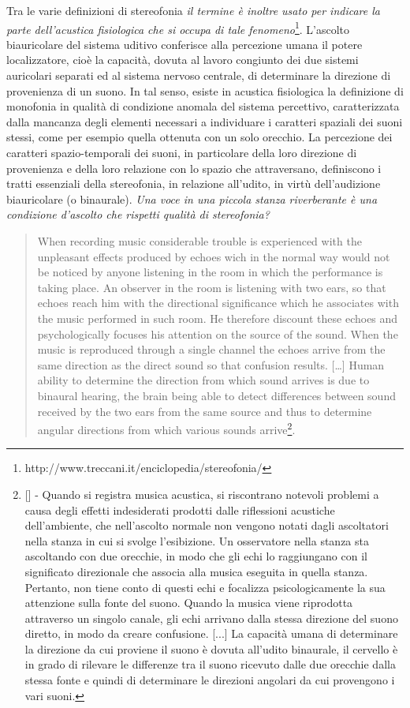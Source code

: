 Tra le varie definizioni di stereofonia \emph{il
termine è inoltre usato per indicare la parte dell’acustica fisiologica
che si occupa di tale fenomeno}\footnote{http://www.treccani.it/enciclopedia/stereofonia/}.
L'ascolto biauricolare del sistema uditivo
conferisce alla percezione umana il potere localizzatore, cioè la capacità,
dovuta al lavoro congiunto dei due sistemi auricolari separati ed al sistema
nervoso centrale, di determinare la direzione di provenienza di un suono. In tal
senso, esiste in acustica fisiologica la definizione di monofonia in qualità di
condizione anomala del sistema percettivo, caratterizzata dalla mancanza degli
elementi necessari a individuare i caratteri spaziali dei suoni stessi, come per
esempio quella ottenuta con un solo orecchio. La percezione dei caratteri
spazio-temporali dei suoni, in particolare della
loro direzione di provenienza e della loro relazione con lo spazio che
attraversano, definiscono i tratti essenziali della stereofonia, in relazione
all'udito, in virtù dell’audizione biauricolare (o binaurale). \emph{Una voce in
una piccola stanza riverberante è una condizione d'ascolto che
rispetti qualità di stereofonia?}

\begin{quotation}
When recording music considerable trouble is experienced with the unpleasant
effects produced by echoes wich in the normal way would not be noticed by anyone
listening in the room in which the performance is taking place.
An observer in the room is listening with two ears, so that echoes reach him
with the directional significance which he associates with the music performed
in such room. He therefore discount these echoes and psychologically focuses
his attention on the source of the sound. When the music is reproduced through
a single channel the echoes arrive from the same direction as the direct sound
so that confusion results. [\ldots] Human ability to determine the direction
from which sound arrives is due to binaural hearing, the brain being able to
detect differences between sound received by the two ears from the same source
and thus to determine angular directions from which various sounds
arrive\footnote{[\cite{ab58}] - Quando si registra musica acustica, si riscontrano
notevoli problemi a causa degli effetti indesiderati prodotti dalle riflessioni
acustiche dell'ambiente, che nell'ascolto normale non vengono notati dagli
ascoltatori nella stanza in cui si svolge l'esibizione.
Un osservatore nella stanza sta ascoltando con due orecchie, in
modo che gli echi lo raggiungano con il significato direzionale che associa alla
musica eseguita in quella stanza. Pertanto, non tiene conto di questi echi e
focalizza psicologicamente la sua attenzione sulla fonte del suono. Quando la
musica viene riprodotta attraverso un singolo canale, gli echi arrivano dalla
stessa direzione del suono diretto, in modo da creare confusione. [...] La
capacità umana di determinare la direzione da cui proviene il suono è dovuta
all'udito binaurale, il cervello è in grado di rilevare le differenze tra il
suono ricevuto dalle due orecchie dalla stessa fonte e quindi di determinare le
direzioni angolari da cui provengono i vari suoni.}.
\end{quotation}

